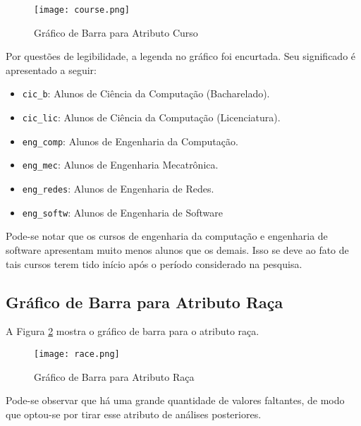 \begin{figure}[!ht]
    \caption{Gráfico de Barra para Atributo Curso}
    \centering
    \texttt{[image: course.png]}
    \label{atr_course}
\end{figure}

Por questões de legibilidade, a legenda no gráfico foi encurtada. Seu significado é
apresentado a seguir: 
\begin{itemize}
    \item \texttt{cic\_b}: Alunos de Ciência da Computação (Bacharelado).
    \item \texttt{cic\_lic}: Alunos de Ciência da Computação (Licenciatura).
    \item \texttt{eng\_comp}: Alunos de Engenharia da Computação.
    \item \texttt{eng\_mec}: Alunos de Engenharia Mecatrônica.
    \item \texttt{eng\_redes}: Alunos de Engenharia de Redes. 
    \item \texttt{eng\_softw}: Alunos de Engenharia de Software
\end{itemize}

Pode-se notar que os cursos de engenharia da computação e engenharia de software
apresentam muito menos alunos que os demais. Isso se deve ao fato de tais cursos
terem tido início após o período considerado na pesquisa. 
\clearpage

\subsection{Gráfico de Barra para Atributo Raça}
A Figura \ref{atr_race} mostra o gráfico de barra para o atributo raça. 
\begin{figure}[!ht]
    \caption{Gráfico de Barra para Atributo Raça}
    \centering
    \texttt{[image: race.png]}
    \label{atr_race}
\end{figure}
Pode-se observar que há uma grande quantidade de valores faltantes, de modo que
optou-se por tirar esse atributo de análises posteriores. 

